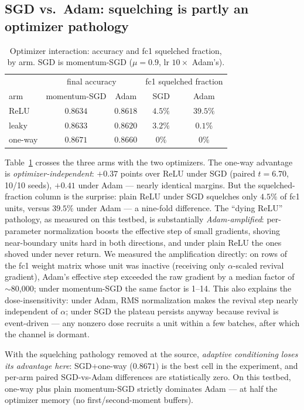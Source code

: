 \documentclass[11pt]{article}
\begin{document}
\subsection{SGD vs.\ Adam: squelching is partly an optimizer pathology}
\label{sec:sgd}

\begin{table}[h]
\centering
\caption{Optimizer interaction: accuracy and fc1 squelched fraction,
by arm. SGD is momentum-SGD ($\mu{=}0.9$, lr $10\times$ Adam's).}
\label{tab:sgd}
\begin{tabular}{lcc|cc}
\toprule
 & \multicolumn{2}{c|}{final accuracy} & \multicolumn{2}{c}{fc1 squelched fraction} \\
arm & momentum-SGD & Adam & SGD & Adam \\
\midrule
ReLU     & $0.8634$ & $0.8618$ & $4.5\%$ & $39.5\%$ \\
leaky    & $0.8633$ & $0.8620$ & $3.2\%$ & $0.1\%$ \\
one-way  & $\mathbf{0.8671}$ & $0.8660$ & $0\%$ & $0\%$ \\
\bottomrule
\end{tabular}
\end{table}

Table~\ref{tab:sgd} crosses the three arms with the two optimizers.
The one-way advantage is \emph{optimizer-independent}: $+0.37$ points
over ReLU under SGD (paired $t{=}6.70$, 10/10 seeds), $+0.41$ under Adam
--- nearly identical margins. But the squelched-fraction column is the
surprise: plain ReLU under SGD squelches only $4.5\%$ of fc1 units,
versus $39.5\%$ under Adam --- a nine-fold difference. The ``dying ReLU''
pathology, as measured on this testbed, is substantially
\emph{Adam-amplified}: per-parameter normalization boosts the effective
step of small gradients, shoving near-boundary units hard in both
directions, and under plain ReLU the ones shoved under never return. We
measured the amplification directly: on rows of the fc1 weight matrix
whose unit was inactive (receiving only $\alpha$-scaled revival
gradient), Adam's effective step exceeded the raw gradient by a median
factor of $\sim$80{,}000; under momentum-SGD the same factor is 1--14.
This also explains the dose-insensitivity: under Adam, RMS normalization
makes the revival step nearly independent of $\alpha$; under SGD the
plateau persists anyway because revival is event-driven --- any nonzero
dose recruits a unit within a few batches, after which the channel is
dormant.

With the squelching pathology removed at the source, \emph{adaptive
conditioning loses its advantage here}: SGD+one-way ($0.8671$) is
the best cell in the experiment, and per-arm paired SGD-vs-Adam
differences are statistically zero. On this testbed, one-way plus plain
momentum-SGD strictly dominates Adam --- at half the optimizer memory
(no first/second-moment buffers).
\end{document}
